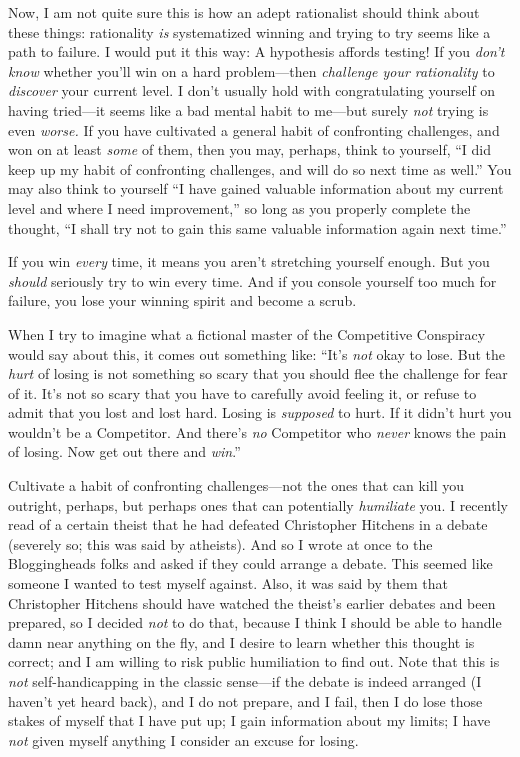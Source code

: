 {
 Now, I am not quite sure this is how an adept rationalist should
think about these things: rationality \textit{is} systematized winning
and trying to try seems like a path to failure. I would put it this
way: A hypothesis affords testing! If you \textit{don't
know} whether you'll win on a hard problem---then
\textit{challenge your rationality} to \textit{discover} your current
level. I don't usually hold with congratulating
yourself on having tried---it seems like a bad mental habit to me---but
surely \textit{not} trying is even \textit{worse.} If you have
cultivated a general habit of confronting challenges, and won on at
least \textit{some} of them, then you may, perhaps, think to yourself,
``I did keep up my habit of confronting challenges,
and will do so next time as well.'' You may also
think to yourself ``I have gained valuable information
about my current level and where I need
improvement,'' so long as you properly complete the
thought, ``I shall try not to gain this same valuable
information again next time.''}

{
 If you win \textit{every} time, it means you
aren't stretching yourself enough. But you
\textit{should} seriously try to win every time. And if you console
yourself too much for failure, you lose your winning spirit and become
a scrub.}

{
 When I try to imagine what a fictional master of the Competitive
Conspiracy would say about this, it comes out something like:
``It's \textit{not} okay to lose. But
the \textit{hurt} of losing is not something so scary that you should
flee the challenge for fear of it. It's not so scary
that you have to carefully avoid feeling it, or refuse to admit that
you lost and lost hard. Losing is \textit{supposed} to hurt. If it
didn't hurt you wouldn't be a
Competitor. And there's \textit{no} Competitor who
\textit{never} knows the pain of losing. Now get out there and
\textit{win}.''}

{
 Cultivate a habit of confronting challenges---not the ones that
can kill you outright, perhaps, but perhaps ones that can potentially
\textit{humiliate} you. I recently read of a certain theist that he had
defeated Christopher Hitchens in a debate (severely so; this was said
by atheists). And so I wrote at once to the Bloggingheads folks and
asked if they could arrange a debate. This seemed like someone I wanted
to test myself against. Also, it was said by them that Christopher
Hitchens should have watched the theist's earlier
debates and been prepared, so I decided \textit{not} to do that,
because I think I should be able to handle damn near anything on the
fly, and I desire to learn whether this thought is correct; and I am
willing to risk public humiliation to find out. Note that this is
\textit{not} self-handicapping in the classic sense---if the debate is
indeed arranged (I haven't yet heard back), and I do
not prepare, and I fail, then I do lose those stakes of myself that I
have put up; I gain information about my limits; I have \textit{not}
given myself anything I consider an excuse for losing.}

